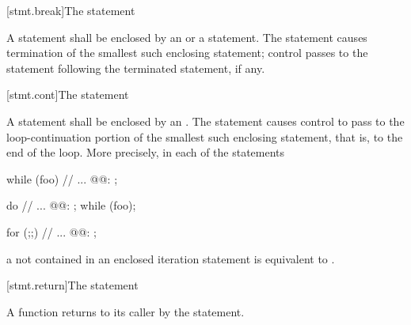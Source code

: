 [stmt.break]{The  statement}%

\pnum
A  statement shall be enclosed by
%
%
an  or
a  statement.
The  statement causes
termination of the smallest such enclosing statement;
control passes to the statement following the
terminated statement, if any.

[stmt.cont]{The  statement}%

\pnum
A 
statement shall be enclosed by an
%
.
The  statement
causes control to pass to the loop-continuation portion of the
smallest such enclosing statement, that is, to the end
of the loop. More precisely, in each of the statements

\begin{minipage}{.30\hsize}
\begin{codeblock}
while (foo) {
  {
    // ...
  }
@@: ;
}
\end{codeblock}
\end{minipage}
\begin{minipage}{.30\hsize}
\begin{codeblock}
do {
  {
    // ...
  }
@@: ;
} while (foo);
\end{codeblock}
\end{minipage}
\begin{minipage}{.30\hsize}
\begin{codeblock}
for (;;) {
  {
    // ...
  }
@@: ;
}
\end{codeblock}
\end{minipage}

a  not contained in an enclosed iteration statement is
equivalent to  .

[stmt.return]{The  statement}%
%
%

\pnum
A function returns to its caller by the  statement.

